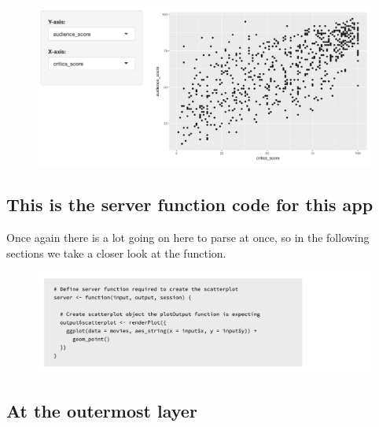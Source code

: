 \documentclass[
  letterpaper,
  DIV=11,
  numbers=noendperiod]{scrreprt}
\begin{document}
\begin{figure}

{\centering \includegraphics[width=1\textwidth,height=\textheight]{./images/app-selectinput-scatterplot.png}

}

\end{figure}

\hypertarget{this-is-the-server-function-code-for-this-app}{%
\subsection{This is the server function code for this
app}\label{this-is-the-server-function-code-for-this-app}}

Once again there is a lot going on here to parse at once, so in the
following sections we take a closer look at the function.

\begin{figure}

{\centering \includegraphics[width=1\textwidth,height=\textheight]{./images/server.png}

}

\end{figure}

\hypertarget{at-the-outermost-layer}{%
\subsection{At the outermost layer}\label{at-the-outermost-layer}}
\end{document}
